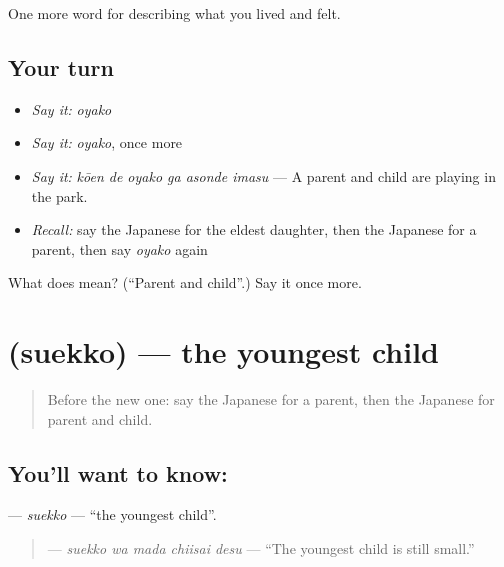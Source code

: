 \begin{grammarlens}[title={What you've built}]
One more word for describing what you lived and felt.
\end{grammarlens}

\subsection*{Your turn}
\begin{itemize}
\raggedright
  \item \emph{Say it:} \emph{oyako}
  \item \emph{Say it:} \emph{oyako}, once more
  \item \emph{Say it:} \emph{kōen de oyako ga asonde imasu} — A parent and child are playing in the park.
  \item \emph{Recall:} say the Japanese for the eldest daughter, then the Japanese for a parent, then say \emph{oyako} again
\end{itemize}

\begin{tcolorbox}[breakable,colback=teal!4,colframe=teal!35!black,title={Before you move on}]
What does  mean? (\textquotedblleft{}Parent and child\textquotedblright{}.) Say it once more.
\end{tcolorbox}
\section[\texorpdfstring{\ja{すえっこ} (suekko)}{すえっこ (suekko)}]{ (suekko) — the youngest child}

\label{lesson:JA-C477-suekko}



\begin{quote}
Before the new one: say the Japanese for a parent, then the Japanese for parent and child.
\end{quote}

\subsection*{You'll want to know: }
\textbf{} — \emph{suekko} — \textquotedblleft{}the youngest child\textquotedblright{}.

\begin{quote}
\textbf{  } — \emph{suekko wa mada chiisai desu} — \textquotedblleft{}The youngest child is still small.\textquotedblright{}
\end{quote}

